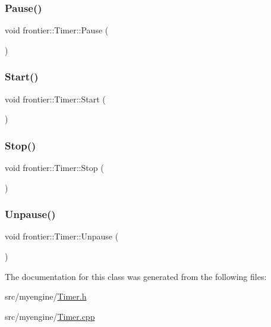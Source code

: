 \subsubsection{\texorpdfstring{Pause()}{Pause()}}
{\footnotesize\ttfamily void frontier\+::\+Timer\+::\+Pause (\begin{DoxyParamCaption}{ }\end{DoxyParamCaption})}

\mbox{\label{classfrontier_1_1_timer_a26c5d9aeddfcb91bea46d7f14b35e923}} 
\subsubsection{\texorpdfstring{Start()}{Start()}}
{\footnotesize\ttfamily void frontier\+::\+Timer\+::\+Start (\begin{DoxyParamCaption}{ }\end{DoxyParamCaption})}

\mbox{\label{classfrontier_1_1_timer_a878f61e350e7bb28350964f105192533}} 
\subsubsection{\texorpdfstring{Stop()}{Stop()}}
{\footnotesize\ttfamily void frontier\+::\+Timer\+::\+Stop (\begin{DoxyParamCaption}{ }\end{DoxyParamCaption})}

\mbox{\label{classfrontier_1_1_timer_a18d0b8d623b50b64fb0893cd9dec56ce}} 
\subsubsection{\texorpdfstring{Unpause()}{Unpause()}}
{\footnotesize\ttfamily void frontier\+::\+Timer\+::\+Unpause (\begin{DoxyParamCaption}{ }\end{DoxyParamCaption})}



The documentation for this class was generated from the following files\+:\begin{DoxyCompactItemize}
\item 
src/myengine/\hyperlink{_timer_8h}{Timer.\+h}\item 
src/myengine/\hyperlink{_timer_8cpp}{Timer.\+cpp}\end{DoxyCompactItemize}
